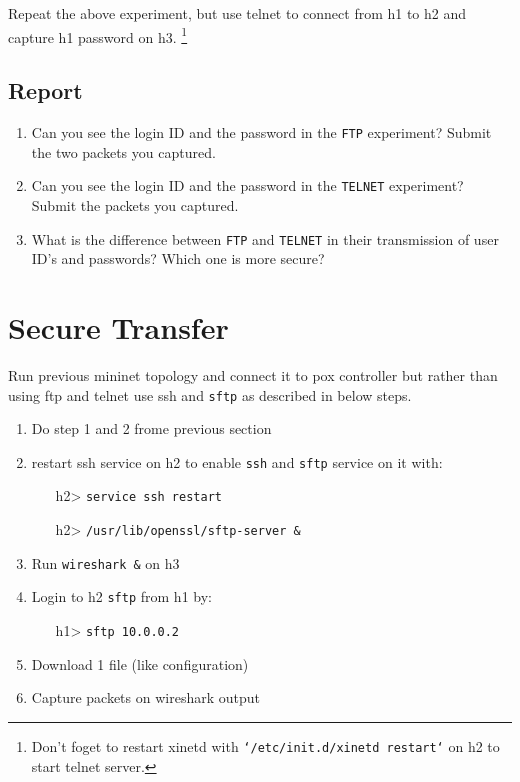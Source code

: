 \documentclass[10pt,a4paper]{article}
\numberwithin{equation}{section}
\numberwithin{figure}{section}
\numberwithin{table}{section}
\begin{document}
	Repeat the above experiment, but use telnet to connect from h1 to h2 and capture h1 password on h3. \footnote{Don't foget to restart xinetd with \texttt{`/etc/init.d/xinetd restart`} on h2 to start telnet server. }
	
	\subsection*{Report}
	\begin{enumerate}
		\setlength{\itemindent}{0pt}
		\item Can you see the login ID and the password in the \texttt{FTP} experiment? Submit the two packets you captured.
		\item Can you see the login ID and the password in the \texttt{TELNET} experiment? Submit the packets you captured.
		\item What is the difference between \texttt{FTP} and \texttt{TELNET} in their transmission of user ID’s and passwords? Which one is more secure?
	\end{enumerate}
	
	\section{Secure Transfer}
	Run previous mininet topology and connect it to pox controller but rather than using ftp and telnet use ssh and \texttt{sftp} as described in below steps.
	
	\begin{enumerate}
		\setlength{\itemindent}{10pt}
		\item Do step 1 and 2 frome previous section
		\item restart ssh service on h2 to enable \texttt{ssh} and \texttt{sftp} service on it with:
		\begin{enumerate}
			\setlength{\itemindent}{10pt}
			\item [h2>] \texttt{service ssh restart}
			\item [h2>] \texttt{/usr/lib/openssl/sftp-server \&}
		\end{enumerate}
		\item Run \texttt{wireshark \&} on h3
		\item Login to h2 \texttt{sftp} from h1 by:
		\begin{enumerate}
			\setlength{\itemindent}{10pt}
			\item [h1>] \texttt{sftp 10.0.0.2}
		\end{enumerate}
		\item Download 1 file (like configuration)
		\item Capture packets on wireshark output
		
	\end{enumerate}
	
\end{document}
